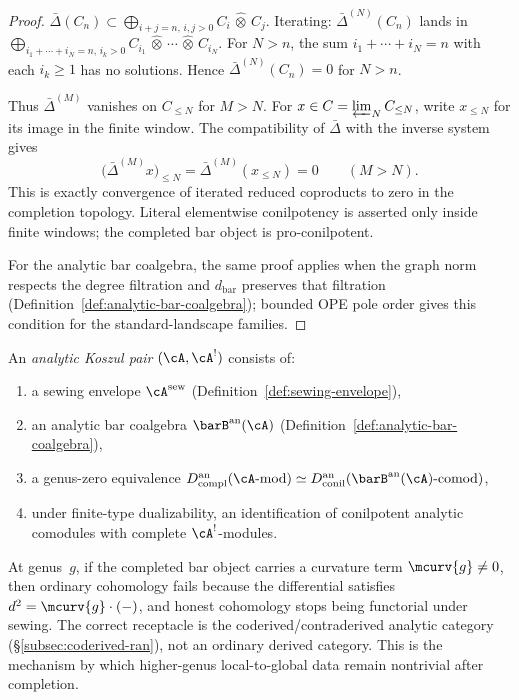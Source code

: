 \begin{proof}
$\bar{\Delta}(C_n) \subset
\bigoplus_{i+j=n,\, i,j > 0} C_i \,\widehat{\otimes}\, C_j$.
Iterating: $\bar{\Delta}^{(N)}(C_n)$ lands in
$\bigoplus_{i_1+\cdots+i_N=n,\, i_k > 0}
C_{i_1} \,\widehat{\otimes}\, \cdots \,\widehat{\otimes}\, C_{i_N}$.
For $N > n$, the sum $i_1 + \cdots + i_N = n$ with each
$i_k \geq 1$ has no solutions.
Hence $\bar{\Delta}^{(N)}(C_n) = 0$ for $N > n$.

Thus $\bar{\Delta}^{(M)}$ vanishes on $C_{\leq N}$ for $M>N$.
For $x\in C=\varprojlim_N C_{\leq N}$, write $x_{\leq N}$ for its
image in the finite window. The compatibility of $\bar{\Delta}$ with
the inverse system gives
\[
\bigl(\bar{\Delta}^{(M)}x\bigr)_{\leq N}
=\bar{\Delta}^{(M)}(x_{\leq N})=0
\qquad (M>N).
\]
This is exactly convergence of iterated reduced coproducts to zero in
the completion topology. Literal elementwise conilpotency is asserted
only inside finite windows; the completed bar object is
pro-conilpotent.

For the analytic bar coalgebra, the same proof applies when the graph
norm respects the degree filtration and $d_{\mathrm{bar}}$ preserves
that filtration (Definition~\ref{def:analytic-bar-coalgebra}); bounded
OPE pole order gives this condition for the standard-landscape
families.
\end{proof}

\begin{definition}%
\label{def:analytic-koszul-pair}%
%
An \emph{analytic Koszul pair} $(\cA, \cA^!)$ consists of:
\begin{enumerate}[label=\textup{(\roman*)}]
\item a sewing envelope $\cA^{\mathrm{sew}}$
 (Definition~\ref{def:sewing-envelope}),
\item an analytic bar coalgebra $\barB^{\mathrm{an}}(\cA)$
 (Definition~\ref{def:analytic-bar-coalgebra}),
\item a genus-zero equivalence
 $D^{\mathrm{an}}_{\mathrm{compl}}(\cA\text{-mod})
 \simeq
 D^{\mathrm{an}}_{\mathrm{conil}}
 (\barB^{\mathrm{an}}(\cA)\text{-comod})$,
\item under finite-type dualizability, an identification of
 conilpotent analytic comodules with complete
 $\cA^!$-modules.
\end{enumerate}
\end{definition}

\begin{remark}%
\label{rem:curvature-coderived-analytic}%
%
At genus~$g$, if the completed bar object carries a curvature term
$\mcurv{g} \neq 0$, then ordinary cohomology fails because the
differential satisfies $d^2 = \mcurv{g} \cdot (-)$, and honest
cohomology stops being functorial under sewing. The correct
receptacle is the coderived/contraderived analytic category
(\S\ref{subsec:coderived-ran}), not an ordinary derived category.
This is the mechanism by which higher-genus local-to-global data
remain nontrivial after completion.
\end{remark}

